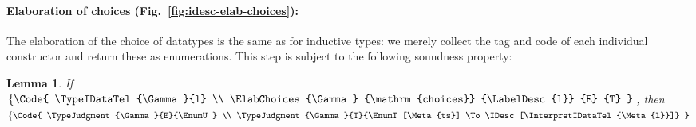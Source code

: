\documentclass{scrartcl}
\theoremstyle{plain}
\newtheorem{lemma}{Lemma}
\theoremstyle{definition}
\begin{document}
\paragraph{Elaboration of choices (Fig.~\ref{fig:idesc-elab-choices}):}
The elaboration of the choice of datatypes is the same as for
inductive types: we merely collect the tag and code of each individual
constructor and return these as enumerations. This step is subject to
the following soundness property:
\begin{lemma}\label{lemma:idesc-elab-choices}
If 
\(\left\{\Code{
\TypeIDataTel{\Gamma}{l} \\
\ElabChoices{\Gamma}
                   {\mathrm{choices}}
                   {\LabelDesc{l}}
                   {E}
                   {T}
}\right.\), then
\(\left\{\Code{
\TypeJudgment{\Gamma}{E}{\EnumU} \\
\TypeJudgment{\Gamma}{T}{\EnumT[\Meta{ts}] \To \IDesc[\InterpretIDataTel{\Meta{l}}]}
}\right.\)

\end{lemma}
\end{document}
